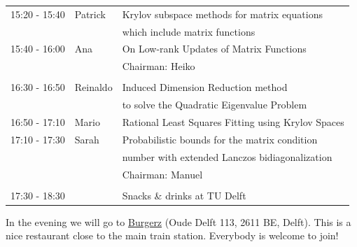 \documentclass{article}
\begin{document}
\begin{table}[h]
\begin{tabular}{lll}
15:20 - 15:40 & Patrick & Krylov subspace methods for matrix equations \\
                  & & which include matrix functions\\ [0.5ex]
15:40 - 16:00 & Ana & On Low-rank Updates of Matrix Functions\\ [0.5ex]
& & \hfill \small{Chairman: Heiko}  \\
\hline \\ [-1.5ex]
16:30 - 16:50 & Reinaldo & Induced Dimension Reduction method \\
            & & to solve the Quadratic Eigenvalue Problem \\ [0.5ex]
16:50 - 17:10 & Mario & Rational Least Squares Fitting using Krylov Spaces\\ [0.5ex]
17:10 - 17:30 & Sarah & Probabilistic bounds for the matrix condition  \\
                    & & number with extended Lanczos bidiagonalization\\ [0.5ex]
& & \hfill \small{Chairman: Manuel}\\
\hline \\ [-1.5ex]
17:30 - 18:30 & & Snacks \& drinks at TU Delft
\end{tabular}
\end{table}

In the evening we will go to \href{http://www.burgerz.nl/en/contact/delft}{Burgerz} (Oude Delft 113, 2611 BE, Delft). This is a nice restaurant close to the main train station. Everybody is welcome to join!
\end{document}
